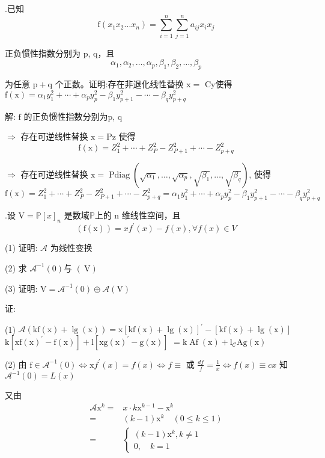 \documentclass{article}
\begin{document}
\vspace{1ex}
{.}已知
$$
    \mathrm{f}\left(x_{1} x_{2} \ldots x_{n}\right)=\sum_{i=1}^{n} \sum_{j=1}^{n} a_{i j} x_{i} x_{j}
$$

正负惯性指数分别为 p, q，且
$$
    \alpha_{1}, \alpha_{2}, \ldots, \alpha_{p}, \beta_{1}, \beta_{2}, \ldots, \beta_{p}
$$

为任意 $\mathrm{p}+\mathrm{q}$ 个正数。证明:存在非退化线性替换 $\mathrm{x}=$ Cy使得 $\mathrm{f}(\mathrm{x})=\alpha_{1} y_{1}^{2}+\cdots+\alpha_{p} y_{p}^{2}-\beta_{1} y_{p+1}^{2}-\cdots-\beta_{q} y_{p+q}^{2}$

解: $\mathrm{f}$ 的正负惯性指数分别为p, q

$\Rightarrow$ 存在可逆线性替换 $\mathrm{x}=\mathrm{Pz}$ 使得
$$\mathrm{f}(\mathrm{x})=Z_{1}^{2}+\cdots+Z_{P}^{2}-Z_{P+1}^{2}+\cdots-Z_{p+q}^{2}$$

$\Rightarrow$ 存在可逆线性替换 $\mathrm{x}=\operatorname{Pdiag}\left(\sqrt{\alpha_{1}}, \ldots, \sqrt{\alpha_{p}}, \sqrt{\beta_{1}}, \ldots, \sqrt{\beta_{q}}\right)$, 使得
$$
    \mathrm{f}(\mathrm{x})=Z_{1}^{2}+\cdots+Z_{P}^{2}-Z_{P+1}^{2}+\cdots-Z_{p+q}^{2}=\alpha_{1} y_{1}^{2}+\cdots+\alpha_{p} y_{p}^{2}-\beta_{1} y_{p+1}^{2}-\cdots-\beta_{q} y_{p+q}^{2}
$$

\vspace{1ex}
{.}设 $\mathrm{V}=\mathbb{P}[x]_{n}$ 是数域$\mathbb{P}$上的 $\mathrm{n}$ 维线性空间，且
$$(\mathrm{f}(\mathrm{x}))=x f^{\prime}(x)-f(x), \forall f(x) \in V$$

(1) 证明: $\mathcal{A}$ 为线性变换

(2) 求 $\mathcal{A}^{-1}(0)$与 $(\mathrm{~V})$

(3) 证明: $\mathrm{V}=\mathcal{A}^{-1}(0) \oplus \mathcal{A}(\mathrm{V})$

证:

(1) $\mathcal{A}(\mathrm{kf}(\mathrm{x})+\lg (\mathrm{x}))=\mathrm{x}[\mathrm{kf}(\mathrm{x})+\lg (\mathrm{x})]^{\prime}-[\mathrm{kf}(\mathrm{x})+\lg (\mathrm{x})]$
$\mathrm{k}\left[\mathrm{xf}(\mathrm{x})^{\prime}-\mathrm{f}(\mathrm{x})\right]+\mathrm{l}\left[\mathrm{xg}(\mathrm{x})^{\prime}-\mathrm{g}(\mathrm{x})\right]$
$=\mathrm{k} \operatorname{Af}(\mathrm{x})+\mathrm{l}_{\mathcal{C}} \mathrm{Ag}(\mathrm{x})$

(2) 由
$\mathrm{f} \in \mathcal{A}^{-1}(0) \Leftrightarrow \mathrm{x} f^{\prime}(x)=f(x) \Leftrightarrow f \equiv$ 或 $\frac{d f}{f}=\frac{1}{x} \Leftrightarrow f(x) \equiv c x$ 知$\mathcal{A}^{-1}(0)=L(x)$

又由
$$
    \begin{aligned}
        \mathcal{A} \mathrm{x}^{k}= & x \cdot k \mathrm{x}^{k-1}-\mathrm{x}^{k}   \\
        =                           & (k-1) \mathrm{x}^{k} \quad(0 \leq k \leq 1) \\
        =                           & \left\{\begin{array}{l}
            (k-1) \mathrm{x}^{k}, k \neq 1 \\
            0, \quad k=1
        \end{array}\right.
    \end{aligned}
$$
\end{document}
